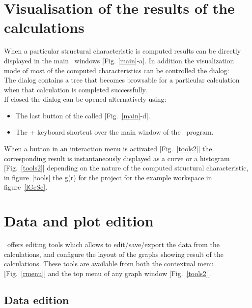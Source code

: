 \section{Visualisation of the results of the calculations} 

When a particular structural characteristic is computed results can be directly displayed in the main \atomes\ windows [Fig. \ref{main}-a]. 
In addition the visualization mode of most of the computed characteristics can be controlled the  dialog:\\
\laf The  dialog contains a tree that becomes browsable for a particular calculation when that calculation is completed successfully. \\
If closed the  dialog can be opened alternatively using:
\begin{itemize}
\item The last button of the  called  [Fig.~\ref{main}-d].
\item The \Ctrl +  keyboard shortcut over the main window of the \atomes\ program. 
\end{itemize}
\toolfig
When a button in an interaction menu is activated [Fig.~\ref{tools2}] the corresponding result is instantaneously displayed as a curve or a histogram [Fig.~\ref{tools2}] depending on the nature of the computed structural characteristic, in figure~\ref{tools} the g(r) for the project  for the example workspace in figure~\ref{lGeSe}. 

\clearpage

\section{Data and plot edition}
\label{dpedition}

\atomes\ offers editing tools which allows to edit/save/export the data from the calculations, and configure the layout of the graphs showing result of the calculations. 
These tools are available from both the contextual menu [Fig.~\ref{rmenu}] and the top menu of any graph window [Fig.~\ref{tools2}]. 

\subsection{Data edition}

